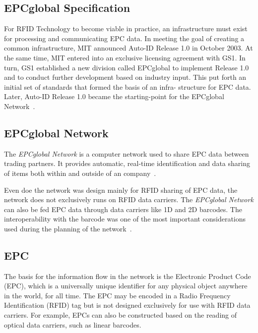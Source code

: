 \subsection{EPCglobal Specification}

For RFID Technology to become viable in practice, an infrastructure must exist for processing and communicating EPC data. In meeting the goal of creating a common infrastructure, MIT announced Auto-ID Release 1.0 in October 2003. At the same time, MIT entered into an exclusive licensing agreement with GS1.
In turn, GS1 established a new division called EPCglobal to implement Release 1.0 and to conduct further development based on industry input. This put forth an initial set of standards that formed the basis of an infra- structure for EPC data. Later, Auto-ID Release 1.0 became the starting-point for the EPCglobal Network~\cite[p. 50]{GlobalRFIDValue}. 


\subsection{EPCglobal Network}

The \emph{EPCglobal Network} is a computer network used to share \gls{EPC} data between trading partners. 
It provides automatic, real-time identification and data sharing of items both within and outside of an company~\cite[p. 213]{lahiriRFIDSourcebook2005}.

Even doe the network was design mainly for \gls{RFID} sharing of \gls{EPC} data, the network does not exclusively runs on \gls{RFID} data carriers. The \emph{EPCglobal Network} can also be fed \gls{EPC} data through data carriers like 1D and 2D barcodes. The interoperability with the barcode was one of the most important considerations used during the planning of the network~\cite{RFIDBarcodeInteroperability}.


\subsection{EPC}

The basis for the information flow in the network is the Electronic Product Code (EPC), which is a universally unique identifier for any physical object anywhere in the world, for all time. 
The EPC may be encoded in a Radio Frequency Identification (RFID) tag but is not designed exclusively for use with RFID data carriers. For example, EPCs can also be constructed based on the reading of optical data carriers, such as linear barcodes. 

